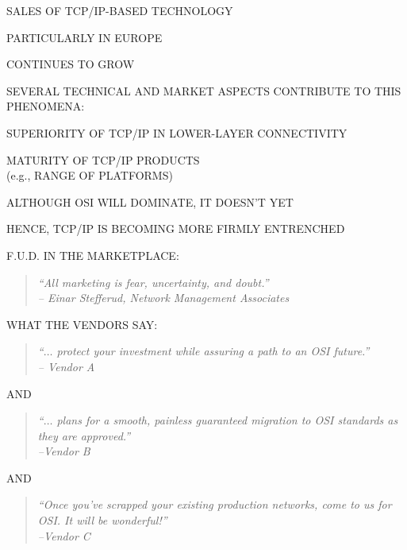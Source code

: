 \begin{bwslide}

\begin{nrtc}
\item	SALES OF TCP/IP-BASED TECHNOLOGY
    \begin{nrtc}
    \item	PARTICULARLY IN EUROPE
    \end{nrtc}
	CONTINUES TO GROW

\item	SEVERAL TECHNICAL AND MARKET ASPECTS CONTRIBUTE TO THIS PHENOMENA:
    \begin{nrtc}
    \item	SUPERIORITY OF TCP/IP IN LOWER-LAYER CONNECTIVITY

    \item	MATURITY OF TCP/IP PRODUCTS\\ (e.g., RANGE OF PLATFORMS)
    \end{nrtc}

\item	ALTHOUGH OSI WILL DOMINATE, IT DOESN'T YET

\item	HENCE, TCP/IP IS BECOMING MORE FIRMLY ENTRENCHED
\end{nrtc}
\end{bwslide}


\begin{bwslide}

\begin{nrtc}
\item	F.U.D. IN THE MARKETPLACE:
\begin{quote}\em
``All marketing is fear, uncertainty, and doubt.''\\ \raggedleft
-- Einar Stefferud, Network Management Associates
\end{quote}

\item	WHAT THE VENDORS SAY:
\begin{quote}\em
``$\ldots$ protect your investment while assuring a path to an OSI
future.''\\ \raggedleft
-- Vendor A
\end{quote}
AND
\begin{quote}\em
``$\ldots$ plans for a smooth, painless guaranteed migration to OSI standards
as they are approved.''\\ \raggedleft
--Vendor B
\end{quote}
AND
\begin{quote}\em
``Once you've scrapped your existing production networks,
come to us for OSI.
It will be wonderful!''\\ \raggedleft
--Vendor C
\end{quote}
\end{nrtc}
\end{bwslide}


